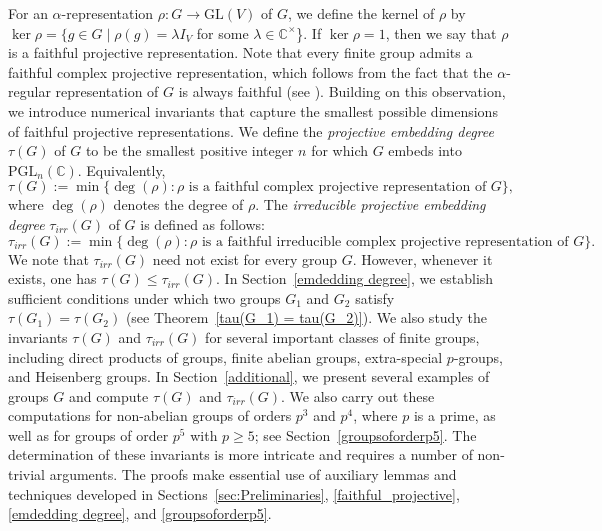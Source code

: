 \documentclass[a4paper,11pt]{amsart}
\numberwithin{equation}{section}
\numberwithin{equation}{subsection}
\newcommand{\C}{\mathbb{C}}
\newcommand{\ti}{\tau_{irr}(G)}
\newcommand{\PGL}{\mathrm{PGL}}
\begin{document}
	
	For an $\alpha$-representation  $\rho : G \to \mathrm{GL}(V)$ of $G$, we define the kernel of $\rho$ by $\ker \rho=\{ g \in G \mid \rho(g) = \lambda I_V$ for some $\lambda\in \C^{\times}$\}. If $\ker \rho = 1$, then we say that $\rho$ is a faithful projective representation. Note that every finite group admits a faithful complex projective representation, which follows
	from the fact that the $\alpha$-regular representation of $G$ is always faithful (see \cite[Chapter 7, Section 1]{karpilovsky}).
	Building on this observation, we introduce numerical invariants that capture the smallest possible dimensions of faithful projective representations. We define the \textit{projective embedding degree} $\tau(G)$ of \(G\) to be the smallest positive integer \(n\) for which \(G\) embeds into \(\PGL_n(\mathbb{C})\).
	Equivalently,
	\[
	\tau(G) := \min\{\deg(\rho) : \rho \text{ is a faithful complex  projective representation of } G\},
	\]
	where $\deg(\rho)$ denotes the degree of  $\rho$.
	The \textit{irreducible projective embedding degree} $\ti$ of  $G$ is defined as follows:
	\[
	\ti := \min\{\deg(\rho) : \rho \text{ is a faithful irreducible complex projective representation of } G\}.
	\] 
	We note that \(\tau_{irr}(G)\) need not exist for every group \(G\). However, whenever it exists, one has $\tau(G) \leq \tau_{irr}(G).$
	In Section~\ref{emdedding degree}, we establish sufficient conditions under which two groups \(G_1\) and \(G_2\) satisfy
	$\tau(G_1)= \tau(G_2)$
	(see Theorem~\ref{tau(G_1) = tau(G_2)}). We also study the invariants \(\tau(G)\) and \(\tau_{irr}(G)\) for several important classes of finite groups, including direct products of groups, finite abelian groups, extra-special \(p\)-groups, and Heisenberg groups.
	In Section~\ref{additional}, we present several examples of groups \(G\) and compute \(\tau(G)\) and \(\tau_{irr}(G)\). We also carry out these computations for non-abelian groups of orders \(p^3\) and \(p^4\), where \(p\) is a prime, as well as for groups of order \(p^5\) with \(p \geq 5\); see Section~\ref{groupsoforderp5}. The determination of these invariants is more intricate and requires a number of non-trivial arguments. The proofs make essential use of auxiliary lemmas and techniques developed in Sections~\ref{sec:Preliminaries}, \ref{faithful_projective}, \ref{emdedding degree}, and \ref{groupsoforderp5}.
	
	
	
\end{document}
